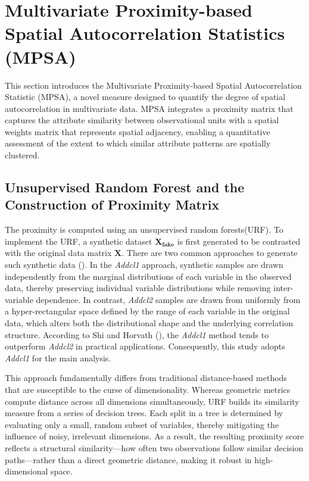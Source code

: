 \documentclass[
  a4paper,
  12pt]{article}
\begin{document}
\section{Multivariate Proximity-based Spatial Autocorrelation Statistics
(MPSA)}\label{multivariate-proximity-based-spatial-autocorrelation-statistics-mpsa}

This section introduces the Multivariate Proximity-based Spatial
Autocorrelation Statistic (MPSA), a novel measure designed to quantify
the degree of spatial autocorrelation in multivariate data. MPSA
integrates a proximity matrix that captures the attribute similarity
between observational units with a spatial weights matrix that
represents spatial adjacency, enabling a quantitative assessment of the
extent to which similar attribute patterns are spatially clustered.

\subsection{Unsupervised Random Forest and the Construction of Proximity
Matrix}\label{unsupervised-random-forest-and-the-construction-of-proximity-matrix}

The proximity is computed using an unsupervised random forests(URF). To
implement the URF, a synthetic dataset \(\mathbf{X_{\text{fake}}}\) is
first generated to be contrasted with the original data matrix
\(\mathbf{X}\). There are two common approaches to generate such
synthetic data (). In the
\emph{Addcl1} approach, synthetic samples are drawn independently from
the marginal distributions of each variable in the observed data,
thereby preserving individual variable distributions while removing
inter-variable dependence. In contrast, \emph{Addcl2} samples are drawn
from uniformly from a hyper-rectangular space defined by the range of
each variable in the original data, which alters both the distributional
shape and the underlying correlation structure. According to Shi and
Horvath (), the \emph{Addcl1} method tends
to outperform \emph{Addcl2} in practical applications. Consequently,
this study adopts \emph{Addcl1} for the main analysis.

This approach fundamentally differs from traditional distance-based
methods that are susceptible to the curse of dimensionality. Whereas
geometric metrics compute distance across all dimensions simultaneously,
URF builds its similarity measure from a series of decision trees. Each
split in a tree is determined by evaluating only a small, random subset
of variables, thereby mitigating the influence of noisy, irrelevant
dimensions. As a result, the resulting proximity score reflects a
structural similarity---how often two observations follow similar
decision paths---rather than a direct geometric distance, making it
robust in high-dimensional space.
\end{document}
